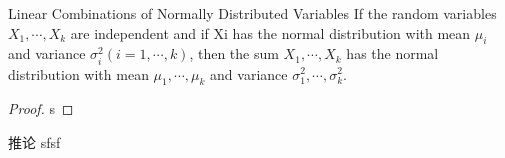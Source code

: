 \documentclass[../常见分布.tex]{subfiles}
\begin{document}
\begin{theorem}{Linear Combinations of Normally Distributed Variables}{}
If the random variables $X_1, \cdots, X_k$ are independent and if Xi has the normal distribution with mean $\mu_i$ and variance $\sigma_i^2(i=1,\cdots,k)$, then the sum $X_1, \cdots, X_k$ has the normal distribution with mean  $\mu_1, \cdots, \mu_k$ and variance $\sigma_1^2, \cdots, \sigma_k^2$.

\end{theorem}
\begin{proof}
s
\end{proof}

\begin{corollary}{推论}{}
sfsf
\end{corollary}
\end{document}
